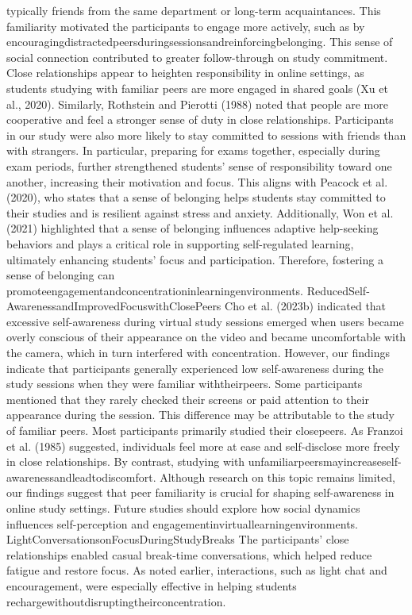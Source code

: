 \documentclass[12pt]{ctexart}
\begin{document}
typically friends from the same department or long-term acquaintances. This
familiarity motivated the participants to engage more actively, such as by
encouragingdistractedpeersduringsessionsandreinforcingbelonging.
This sense of social connection contributed to greater follow-through on study
commitment. Close relationships appear to heighten responsibility in online
settings, as students studying with familiar peers are more engaged in shared
goals (Xu et al., 2020). Similarly, Rothstein and Pierotti (1988) noted that people
are more cooperative and feel a stronger sense of duty in close relationships.
Participants in our study were also more likely to stay committed to sessions with
friends than with strangers. In particular, preparing for exams together, especially
during exam periods, further strengthened students’ sense of responsibility toward
one another, increasing their motivation and focus. This aligns with Peacock et al.
(2020), who states that a sense of belonging helps students stay committed to their
studies and is resilient against stress and anxiety. Additionally, Won et al. (2021)
highlighted that a sense of belonging influences adaptive help-seeking behaviors
and plays a critical role in supporting self-regulated learning, ultimately enhancing
students’ focus and participation. Therefore, fostering a sense of belonging can
promoteengagementandconcentrationinlearningenvironments.
ReducedSelf-AwarenessandImprovedFocuswithClosePeers
Cho et al. (2023b) indicated that excessive self-awareness during virtual study
sessions emerged when users became overly conscious of their appearance on the
video and became uncomfortable with the camera, which in turn interfered with
concentration. However, our findings indicate that participants generally
experienced low self-awareness during the study sessions when they were familiar
withtheirpeers.
Some participants mentioned that they rarely checked their screens or paid
attention to their appearance during the session. This difference may be
attributable to the study of familiar peers. Most participants primarily studied their
closepeers.
As Franzoi et al. (1985) suggested, individuals feel more at ease and
self-disclose more freely in close relationships. By contrast, studying with
unfamiliarpeersmayincreaseself-awarenessandleadtodiscomfort.
Although research on this topic remains limited, our findings suggest that peer
familiarity is crucial for shaping self-awareness in online study settings. Future
studies should explore how social dynamics influences self-perception and
engagementinvirtuallearningenvironments.
LightConversationsonFocusDuringStudyBreaks
The participants’ close relationships enabled casual break-time conversations,
which helped reduce fatigue and restore focus. As noted earlier, interactions, such
as light chat and encouragement, were especially effective in helping students
rechargewithoutdisruptingtheirconcentration.
\end{document}

